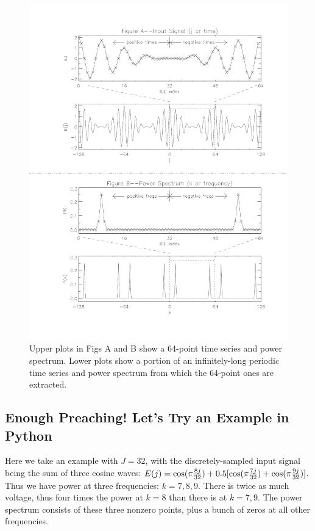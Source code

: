 \documentclass[11pt,preprint]{aastex}
\begin{document}
\begin{figure}[H]
\begin{center}
\leavevmode
\includegraphics[width=6.0in]{fourierbfig.pdf}
\end{center}
\label{figtwo}
\caption{Upper plots in Figs A and B show a 64-point time series and
power spectrum. Lower plots show a portion of an infinitely-long
periodic time series and power spectrum from which the 64-point ones are
extracted.  }
\end{figure}

\subsection{ Enough Preaching! Let's Try an Example in Python}

	Here we take an example with $J=32$, with the discretely-sampled
input signal being the sum of three cosine waves: $E(j) = \cos(\pi {8j
\over 32}) + 0.5[\cos(\pi {7j \over 32}) + \cos(\pi {9j \over 32})]$. 
Thus we have power at three frequencies: $k=7, 8, 9$.  There is twice as
much voltage, thus four times the power at $k=8$ than there is at $k=7,
9$.  The power spectrum consists of these three nonzero points, plus a
bunch of zeros at all other frequencies.
\end{document}
